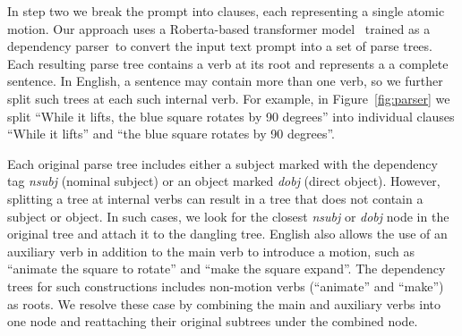 \vspace{0.5em}
In step two we 
break the prompt into clauses, each representing a
single atomic motion.  Our approach uses a Roberta-based transformer
model~\cite{liu2019roberta} trained as a dependency
parser\,\cite{honnibal2020spacy} to convert the input text prompt into
a set of parse trees.
%
Each resulting parse tree contains a verb at its root and represents a
a complete sentence.
%
In English, a sentence may contain more than one verb, so we
further split such trees at each such internal verb.  For example,
in Figure~\ref{fig:parser} we split ``While it lifts, the blue square
rotates by 90 degrees'' into individual clauses ``While it lifts'' and ``the
blue square rotates by 90 degrees''.

%
%    

%
Each original parse tree includes either a subject marked with the dependency tag \textit{nsubj} (nominal subject) or an object marked \textit{dobj} (direct object).
%
However, splitting a tree at internal verbs can result in a tree that does not contain a subject or object.
In such cases, we look for the closest \textit{nsubj} or \textit{dobj}
node in the original tree and attach it to the dangling tree.
%
English also allows the use of an auxiliary verb in
addition to the main verb to introduce a motion, such as “animate the
square to rotate” and “make the square expand”.  The dependency trees
for such constructions includes non-motion verbs (``animate''
and ``make'') as roots.
We resolve these case by combining the 
main and auxiliary verbs into one node and reattaching their original
subtrees under the combined node.

